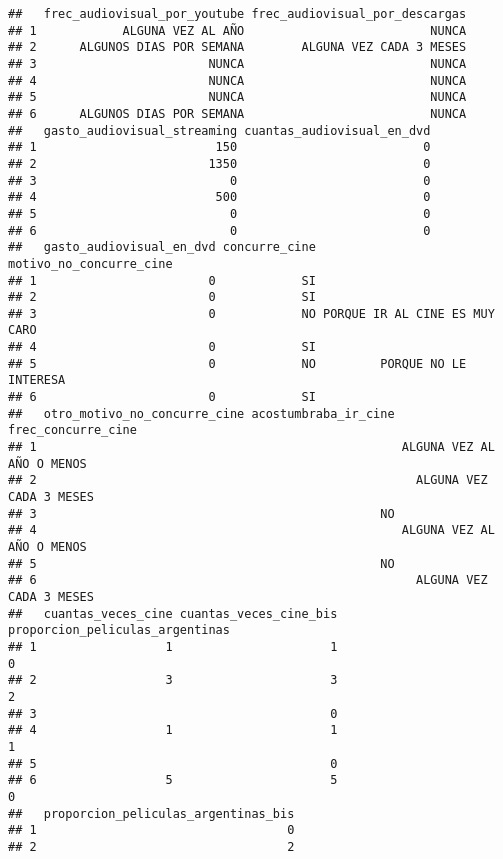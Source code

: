 \documentclass[
]{article}
\begin{document}
\begin{verbatim}
##   frec_audiovisual_por_youtube frec_audiovisual_por_descargas
## 1            ALGUNA VEZ AL AÑO                          NUNCA
## 2      ALGUNOS DIAS POR SEMANA        ALGUNA VEZ CADA 3 MESES
## 3                        NUNCA                          NUNCA
## 4                        NUNCA                          NUNCA
## 5                        NUNCA                          NUNCA
## 6      ALGUNOS DIAS POR SEMANA                          NUNCA
##   gasto_audiovisual_streaming cuantas_audiovisual_en_dvd
## 1                         150                          0
## 2                        1350                          0
## 3                           0                          0
## 4                         500                          0
## 5                           0                          0
## 6                           0                          0
##   gasto_audiovisual_en_dvd concurre_cine       motivo_no_concurre_cine
## 1                        0            SI                              
## 2                        0            SI                              
## 3                        0            NO PORQUE IR AL CINE ES MUY CARO
## 4                        0            SI                              
## 5                        0            NO         PORQUE NO LE INTERESA
## 6                        0            SI                              
##   otro_motivo_no_concurre_cine acostumbraba_ir_cine        frec_concurre_cine
## 1                                                   ALGUNA VEZ AL AÑO O MENOS
## 2                                                     ALGUNA VEZ CADA 3 MESES
## 3                                                NO                          
## 4                                                   ALGUNA VEZ AL AÑO O MENOS
## 5                                                NO                          
## 6                                                     ALGUNA VEZ CADA 3 MESES
##   cuantas_veces_cine cuantas_veces_cine_bis proporcion_peliculas_argentinas
## 1                  1                      1                               0
## 2                  3                      3                               2
## 3                                         0                                
## 4                  1                      1                               1
## 5                                         0                                
## 6                  5                      5                               0
##   proporcion_peliculas_argentinas_bis
## 1                                   0
## 2                                   2

\end{verbatim}
\end{document}
